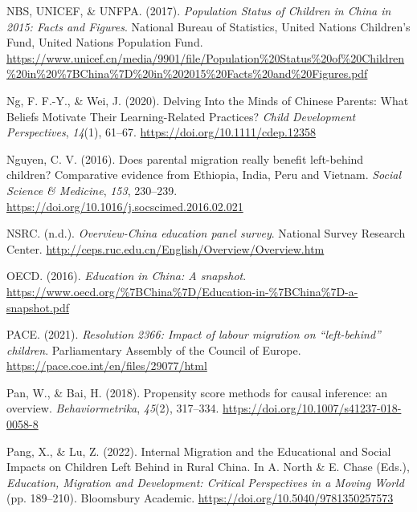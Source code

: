 \documentclass[
  man,floatsintext]{apa7}
\newlength{\cslhangindent}
\newlength{\cslentryspacingunit} %
\newenvironment{CSLReferences}[2] %
 {%
  \setlength{\parindent}{0pt}
  \ifodd #1
  \let\oldpar\par
  \def\par{\hangindent=\cslhangindent\oldpar}
  \fi
  \setlength{\parskip}{#2\cslentryspacingunit}
 }%
 {}
\begin{document}
\begin{CSLReferences}{1}{0}
\leavevmode{}%
NBS, UNICEF, \& UNFPA. (2017). \emph{Population Status of Children in {China} in 2015: Facts and Figures}. National Bureau of Statistics, United Nations Children's Fund, United Nations Population Fund. \url{https://www.unicef.cn/media/9901/file/Population\%20Status\%20of\%20Children\%20in\%20\%7BChina\%7D\%20in\%202015\%20Facts\%20and\%20Figures.pdf}

\leavevmode{}%
Ng, F. F.-Y., \& Wei, J. (2020). Delving Into the Minds of Chinese Parents: What Beliefs Motivate Their Learning-Related Practices? \emph{Child Development Perspectives}, \emph{14}(1), 61--67. \url{https://doi.org/10.1111/cdep.12358}

\leavevmode{}%
Nguyen, C. V. (2016). Does parental migration really benefit left-behind children? Comparative evidence from Ethiopia, India, Peru and Vietnam. \emph{Social Science \& Medicine}, \emph{153}, 230--239. \url{https://doi.org/10.1016/j.socscimed.2016.02.021}

\leavevmode{}%
NSRC. (n.d.). \emph{Overview-{China} education panel survey}. National Survey Research Center. \url{http://ceps.ruc.edu.cn/English/Overview/Overview.htm}

\leavevmode{}%
OECD. (2016). \emph{Education in {China}: A snapshot}. \url{https://www.oecd.org/\%7BChina\%7D/Education-in-\%7BChina\%7D-a-snapshot.pdf}

\leavevmode{}%
PACE. (2021). \emph{Resolution 2366: Impact of labour migration on {``}left-behind{''} children}. Parliamentary Assembly of the Council of Europe. \url{https://pace.coe.int/en/files/29077/html}

\leavevmode{}%
Pan, W., \& Bai, H. (2018). Propensity score methods for causal inference: an overview. \emph{Behaviormetrika}, \emph{45}(2), 317--334. \url{https://doi.org/10.1007/s41237-018-0058-8}

\leavevmode{}%
Pang, X., \& Lu, Z. (2022). Internal Migration and the Educational and Social Impacts on Children Left Behind in Rural {China}. In A. North \& E. Chase (Eds.), \emph{Education, Migration and Development: Critical Perspectives in a Moving World} (pp. 189--210). Bloomsbury Academic. \url{https://doi.org/10.5040/9781350257573}


\end{CSLReferences}
\end{document}
